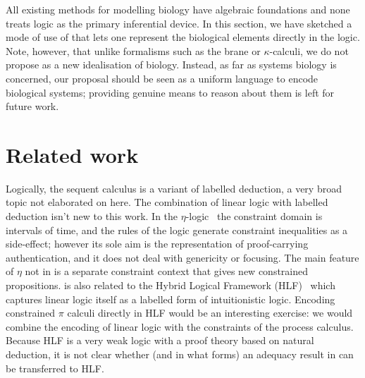 \documentclass{article}
\begin{document}
All existing methods for modelling biology have algebraic foundations and 
none treats logic as the primary inferential device. 
In this section, we have sketched a mode of use of \hyll that lets one
represent the biological elements directly in the logic.
Note, however,
that unlike formalisms such as the brane or $\kappa$-calculi, we do not
propose \hyll as a new idealisation of biology. Instead, as far as systems
biology is concerned, our proposal should be seen as a uniform language to
encode biological systems; 
providing genuine means to reason about them is left for future work.

\section{Related work}
\label{sec:related}

Logically, the \hyll sequent calculus is a variant of labelled deduction, a very
broad topic not elaborated on here. The combination of linear logic with
labelled deduction isn't new to this work. In the
$\eta$-logic~\cite{deyoung08csf} the constraint domain is intervals of time, and
the rules of the logic generate constraint inequalities as a side-effect;
however its sole aim is the representation of proof-carrying authentication, and
it does not deal with genericity or focusing. The main feature of $\eta$ not in
\hyll is a separate constraint context that gives new constrained
propositions. \hyll is also related to the Hybrid Logical Framework
(HLF)~\cite{reed06hylo} which captures linear logic itself as a labelled form of
intuitionistic logic. Encoding constrained $\pi$ calculi directly in HLF would
be an interesting exercise: we would combine the encoding of linear logic with
the constraints of the process calculus. Because HLF is a very weak logic with a
proof theory based on natural deduction, it is not clear whether (and in what
forms) an adequacy result in \hyll can be transferred to HLF.
\end{document}
